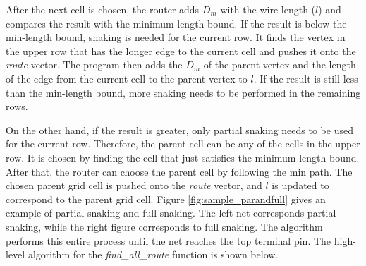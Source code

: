After the next cell is chosen, the router adds $D_m$ with the wire length ($l$) and compares the result with the minimum-length bound. If the result is below the min-length bound, snaking is needed for the current row. It finds the vertex in the upper row that has the longer edge to the current cell and pushes it onto the \textit{route} vector. The program then adds the $D_m$ of the parent vertex and the length of the edge from the current cell to the parent vertex to $l$. If the result is still less than the min-length bound, more snaking needs to be performed in the remaining rows. 

On the other hand, if the result is greater, only partial snaking needs to be used for the current row. Therefore, the parent cell can be any of the cells in the upper row. It is chosen by finding the cell that just satisfies the minimum-length bound. After that, the router can choose the parent cell by following the min path. The chosen parent grid cell is pushed onto the \textit{route} vector, and $l$ is updated to correspond to the parent grid cell. Figure \ref{fig:sample_parandfull} gives an example of partial snaking and full snaking. The left net corresponds partial snaking, while the right figure corresponds to full snaking. The algorithm performs this entire process until the net reaches the top terminal pin. The high-level algorithm for the \textit{find\_all\_route} function is shown below.

